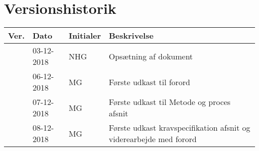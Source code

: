 \documentclass[Rapport/Rapport_main.tex]{subfiles}
\begin{document}
\section{Versionshistorik}
\begin{longtable}{|L{0.07\textwidth}|L{0.15\textwidth}|L{0.13\textwidth}|L{0.55\textwidth}|}
        \hline
        \textbf{Ver.} & \textbf{Dato} & \textbf{Initialer} & \textbf{Beskrivelse}  \\ \hline
        & 03-12-2018 & NHG & Opsætning af dokument \\ \hline
        & 06-12-2018 & MG & Første udkast til forord \\ \hline
        & 07-12-2018 & MG & Første udkast til Metode og proces afsnit \\ \hline
        & 08-12-2018 & MG & Første udkast kravspecifikation afsnit og viderearbejde med forord \\ \hline
\end{longtable}
\end{document}
